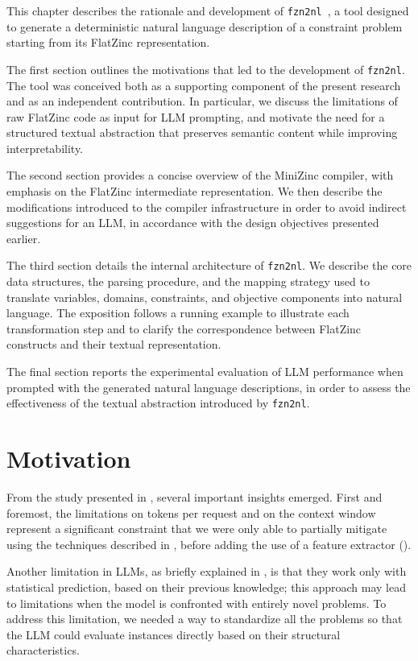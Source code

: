 \documentclass[../../main]{subfiles}
\begin{document}
This chapter describes the rationale and development of \texttt{fzn2nl}~\cite{fzn2nl}, a tool designed to generate a deterministic natural language description of a constraint problem starting from its FlatZinc representation.

The first section outlines the motivations that led to the development of \texttt{fzn2nl}. The tool was conceived both as a supporting component of the present research and as an independent contribution. In particular, we discuss the limitations of raw FlatZinc code as input for LLM prompting, and motivate the need for a structured textual abstraction that preserves semantic content while improving interpretability.

The second section provides a concise overview of the MiniZinc compiler, with emphasis on the FlatZinc intermediate representation. We then describe the modifications introduced to the compiler infrastructure in order to avoid indirect suggestions for an LLM, in accordance with the design objectives presented earlier.

The third section details the internal architecture of \texttt{fzn2nl}. We describe the core data structures, the parsing procedure, and the mapping strategy used to translate variables, domains, constraints, and objective components into natural language. The exposition follows a running example to illustrate each transformation step and to clarify the correspondence between FlatZinc constructs and their textual representation.

The final section reports the experimental evaluation of LLM performance when prompted with the generated natural language descriptions, in order to assess the effectiveness of the textual abstraction introduced by \texttt{fzn2nl}.

\section{Motivation}

From the study presented in , several important insights emerged. First and foremost, the limitations on tokens per request and on the context window represent a significant constraint that we were only able to partially mitigate using the techniques described in , before adding the use of a feature extractor ().

Another limitation in LLMs, as briefly explained in , is that they work only with statistical prediction, based on their previous knowledge; this approach may lead to limitations when the model is confronted with entirely novel problems. To address this limitation, we needed a way to standardize all the problems so that the LLM could evaluate instances directly based on their structural characteristics.
\end{document}
